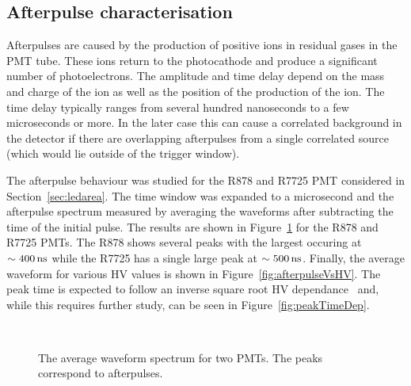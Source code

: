 \documentclass[12pt]{article}
\newcommand{\unit}[1]{\ensuremath{\text{\,#1}}\xspace}
\begin{document}
\subsection{Afterpulse characterisation}

Afterpulses are caused by the production of positive ions in residual
gases in the PMT tube. These ions return to the photocathode and produce
a significant number of photoelectrons. The amplitude and time delay
depend on the mass and charge of the ion as well as the position of the 
production of the ion. The time delay typically ranges from several 
hundred nanoseconds to a few microseconds or more. In the later case
this can cause a correlated background in the detector if there are
overlapping afterpulses from a single correlated source (which would lie outside
of the trigger window).

The afterpulse behaviour was studied for the R878 and R7725 PMT 
considered in Section~\ref{sec:ledarea}. The time window was expanded to
a microsecond and the afterpulse spectrum measured by
averaging the waveforms after subtracting the time of the initial pulse.
The results are shown in Figure~\ref{fig:afterpulse} for the R878 and R7725 PMTs.
The R878 shows several peaks with the largest occuring at $\sim 400\unit{ns}$ while 
the R7725 has a single large peak at $\sim 500\unit{ns}$. Finally, the average waveform
for various HV values is shown in Figure~\ref{fig:afterpulseVsHV}. The peak
time is expected to follow an inverse square root HV dependance~\cite{MA201193} and,
while this requires further study, can be seen in Figure~\ref{fig:peakTimeDep}.

\begin{figure}[ht!]
    \centering
    ~
    \caption{\label{fig:afterpulse} The average waveform spectrum for two PMTs. The peaks correspond 
    to afterpulses.
    }
\end{figure}
\end{document}
